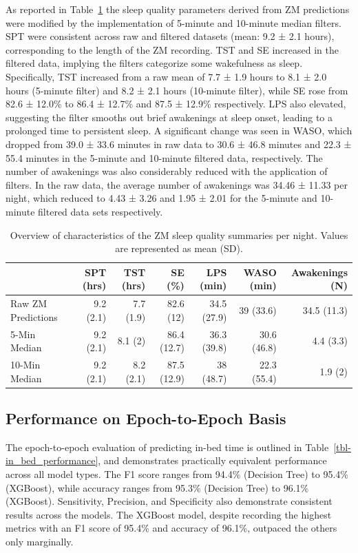 \documentclass[
  super,
  preprint,
  3p]{elsarticle}
\begin{document}
As reported in Table~\ref{tbl-zm_overview} the sleep quality parameters
derived from ZM predictions were modified by the implementation of
5-minute and 10-minute median filters. SPT were consistent across raw
and filtered datasets (mean: 9.2 ± 2.1 hours), corresponding to the
length of the ZM recording. TST and SE increased in the filtered data,
implying the filters categorize some wakefulness as sleep. Specifically,
TST increased from a raw mean of 7.7 ± 1.9 hours to 8.1 ± 2.0 hours
(5-minute filter) and 8.2 ± 2.1 hours (10-minute filter), while SE rose
from 82.6 ± 12.0\% to 86.4 ± 12.7\% and 87.5 ± 12.9\% respectively. LPS
also elevated, suggesting the filter smooths out brief awakenings at
sleep onset, leading to a prolonged time to persistent sleep. A
significant change was seen in WASO, which dropped from 39.0 ± 33.6
minutes in raw data to 30.6 ± 46.8 minutes and 22.3 ± 55.4 minutes in
the 5-minute and 10-minute filtered data, respectively. The number of
awakenings was also considerably reduced with the application of
filters. In the raw data, the average number of awakenings was 34.46 ±
11.33 per night, which reduced to 4.43 ± 3.26 and 1.95 ± 2.01 for the
5-minute and 10-minute filtered data sets respectively.

\hypertarget{tbl-zm_overview}{}
\begin{longtable}{lrrrrrr}
\caption{\label{tbl-zm_overview}Overview of characteristics of the ZM sleep quality summaries per night.
Values are represented as mean (SD). }\tabularnewline

\toprule
 & SPT (hrs) & TST (hrs) & SE (\%) & LPS (min) & WASO (min) & Awakenings (N) \\ 
\midrule
Raw ZM Predictions & 9.2 (2.1) & 7.7 (1.9) & 82.6 (12) & 34.5 (27.9) & 39 (33.6) & 34.5 (11.3) \\ 
5-Min Median & 9.2 (2.1) & 8.1 (2) & 86.4 (12.7) & 36.3 (39.8) & 30.6 (46.8) & 4.4 (3.3) \\ 
10-Min Median & 9.2 (2.1) & 8.2 (2.1) & 87.5 (12.9) & 38 (48.7) & 22.3 (55.4) & 1.9 (2) \\ 
\bottomrule
\end{longtable}

\hypertarget{performance-on-epoch-to-epoch-basis}{%
\subsection{Performance on Epoch-to-Epoch
Basis}\label{performance-on-epoch-to-epoch-basis}}

The epoch-to-epoch evaluation of predicting in-bed time is outlined in
Table~\ref{tbl-in_bed_performance}, and demonstrates practically
equivalent performance across all model types. The F1 score ranges from
94.4\% (Decision Tree) to 95.4\% (XGBoost), while accuracy ranges from
95.3\% (Decision Tree) to 96.1\% (XGBoost). Sensitivity, Precision, and
Specificity also demonstrate consistent results across the models. The
XGBoost model, despite recording the highest metrics with an F1 score of
95.4\% and accuracy of 96.1\%, outpaced the others only marginally.
\end{document}
